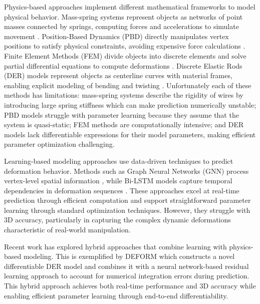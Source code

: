 Physics-based approaches implement different mathematical frameworks to model physical behavior.
Mass-spring systems represent objects as networks of point masses connected by springs, computing forces and accelerations to simulate movement \cite{LargeStepSimulation, diffcloth, Liu:2013:FSM}. 
Position-Based Dynamics (PBD) directly manipulates vertex positions to satisfy physical constraints, avoiding expensive force calculations \cite{directionalrigidity, diminishingridgidity, xpbd}. 
Finite Element Methods (FEM) divide objects into discrete elements and solve partial differential equations to compute deformations \cite{garcia2006optimized, sin2013vega, koessler2021efficient}. 
Discrete Elastic Rods (DER) models represent objects as centerline curves with material frames, enabling explicit modeling of bending and twisting \cite{diminishingridgidity, DER_manipulation1, DER_manipulation2, DER_manipulation3}.
Unfortunately each of these methods has limitations: mass-spring systems describe the rigidity of wires by introducing large spring stiffness which can make prediction numerically unstable; PBD models struggle with parameter learning because they assume that the system is quasi-static; FEM methods are computationally intensive; and DER models lack differentiable expressions for their model parameters, making efficient parameter optimization challenging. 

Learning-based modeling approaches use data-driven techniques to predict deformation behavior. 
Methods such as Graph Neural Networks (GNN) process vertex-level spatial information \cite{GNN_baseline}, while Bi-LSTM models capture temporal dependencies in deformation sequences \cite{bi-LSTM_baseline}. 
These approaches excel at real-time prediction through efficient computation and support straightforward parameter learning through standard optimization techniques.
However, they struggle with 3D accuracy, particularly in capturing the complex dynamic deformations characteristic of real-world manipulation.

Recent work has explored hybrid approaches that combine learning with physics-based modeling. 
This is exemplified by DEFORM \cite{DEFORM} which constructs a novel differentiable DER model and combines it with a neural network-based residual learning approach to account for numerical integration errors during prediction. 
This hybrid approach achieves both real-time performance and 3D accuracy while enabling efficient parameter learning through end-to-end differentiability. 

